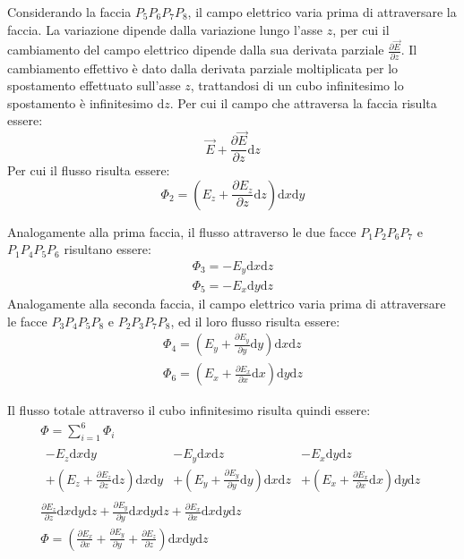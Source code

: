 \documentclass{article}
\newcommand{\df}{\mathrm{d}}
\numberwithin{equation}{subsection}
\begin{document}
Considerando la faccia $P_5P_6P_7P_8$, il campo elettrico varia prima di attraversare la faccia. La variazione dipende dalla variazione lungo l'asse $z$, per cui il cambiamento 
del campo elettrico dipende dalla sua derivata parziale $\displaystyle\frac{\partial\vec{E}}{\partial z}$. Il cambiamento effettivo è dato dalla derivata parziale 
moltiplicata per lo spostamento effettuato sull'asse $z$, trattandosi di un cubo infinitesimo lo spostamento è infinitesimo $\df z$. Per cui il campo che attraversa la faccia 
risulta essere:
\begin{equation*}
    \vec{E}+\displaystyle\frac{\partial \vec{E}}{\partial z}\df z
\end{equation*} 
Per cui il flusso risulta essere:
\begin{equation*}
    \Phi_2=\left(E_z+\displaystyle\frac{\partial E_z}{\partial z}\df z\right)\df x\df y
\end{equation*}

Analogamente alla prima faccia, il flusso attraverso le due facce $P_1P_2P_6P_7$ e $P_1P_4P_5P_6$ risultano essere:
\begin{gather*}
    \Phi_3=-E_y\df x\df z\\
    \Phi_5=-E_x\df y\df z
\end{gather*}
Analogamente alla seconda faccia, il campo elettrico varia prima di attraversare le facce $P_3P_4P_5P_8$ e $P_2P_3P_7P_8$, ed il loro flusso risulta essere:
\begin{gather*}
    \Phi_4=\left(E_y+\displaystyle\frac{\partial E_y}{\partial y}\df  y\right)\df x\df z\\
    \Phi_6=\left(E_x+\displaystyle\frac{\partial E_x}{\partial x}\df  x\right)\df y\df z
\end{gather*}

Il flusso totale attraverso il cubo infinitesimo risulta quindi essere:
\begin{gather*}
    \Phi=\displaystyle\sum_{i=1}^6\Phi_i\\
    \begin{matrix}
        -E_z\df x\df y & -E_y\df x\df z & -E_x\df y\df z\\
        +\left(E_z+\displaystyle\frac{\partial E_z}{\partial z}\df z\right)\df x\df y & +\left(E_y+\displaystyle\frac{\partial E_y}{\partial y}\df  y\right)\df x\df z & +\left(E_x+\displaystyle\frac{\partial E_x}{\partial x}\df  x\right)\df y\df z
    \end{matrix}\\
    \displaystyle\frac{\partial E_z}{\partial z}\df x\df y\df z+\frac{\partial E_y}{\partial y}\df x\df y\df z+\frac{\partial E_x}{\partial x}\df x\df y\df z\\
    \Phi=\left(\displaystyle\frac{\partial E_x}{\partial x}+\frac{\partial E_y}{\partial y}+\frac{\partial E_z}{\partial z}\right)\df x\df y\df z
\end{gather*}
\end{document}
